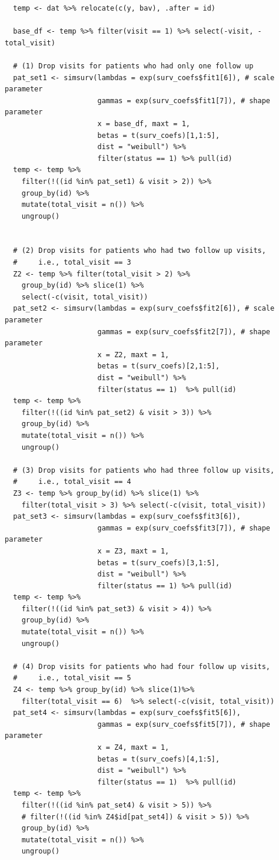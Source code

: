 \documentclass[
]{aft}
\begin{document}
\begin{verbatim}
  temp <- dat %>% relocate(c(y, bav), .after = id) 
  
  base_df <- temp %>% filter(visit == 1) %>% select(-visit, -total_visit)
  
  # (1) Drop visits for patients who had only one follow up 
  pat_set1 <- simsurv(lambdas = exp(surv_coefs$fit1[6]), # scale parameter
                      gammas = exp(surv_coefs$fit1[7]), # shape parameter
                      x = base_df, maxt = 1, 
                      betas = t(surv_coefs)[1,1:5],
                      dist = "weibull") %>% 
                      filter(status == 1) %>% pull(id)
  temp <- temp %>% 
    filter(!((id %in% pat_set1) & visit > 2)) %>% 
    group_by(id) %>% 
    mutate(total_visit = n()) %>% 
    ungroup()
  
  
  # (2) Drop visits for patients who had two follow up visits, 
  #     i.e., total_visit == 3 
  Z2 <- temp %>% filter(total_visit > 2) %>% 
    group_by(id) %>% slice(1) %>% 
    select(-c(visit, total_visit))
  pat_set2 <- simsurv(lambdas = exp(surv_coefs$fit2[6]), # scale parameter
                      gammas = exp(surv_coefs$fit2[7]), # shape parameter
                      x = Z2, maxt = 1, 
                      betas = t(surv_coefs)[2,1:5],
                      dist = "weibull") %>% 
                      filter(status == 1)  %>% pull(id)
  temp <- temp %>% 
    filter(!((id %in% pat_set2) & visit > 3)) %>% 
    group_by(id) %>% 
    mutate(total_visit = n()) %>% 
    ungroup()
  
  # (3) Drop visits for patients who had three follow up visits, 
  #     i.e., total_visit == 4 
  Z3 <- temp %>% group_by(id) %>% slice(1) %>% 
    filter(total_visit > 3) %>% select(-c(visit, total_visit))
  pat_set3 <- simsurv(lambdas = exp(surv_coefs$fit3[6]), 
                      gammas = exp(surv_coefs$fit3[7]), # shape parameter
                      x = Z3, maxt = 1,
                      betas = t(surv_coefs)[3,1:5],
                      dist = "weibull") %>% 
                      filter(status == 1) %>% pull(id)
  temp <- temp %>% 
    filter(!((id %in% pat_set3) & visit > 4)) %>% 
    group_by(id) %>% 
    mutate(total_visit = n()) %>% 
    ungroup()
  
  # (4) Drop visits for patients who had four follow up visits, 
  #     i.e., total_visit == 5 
  Z4 <- temp %>% group_by(id) %>% slice(1)%>% 
    filter(total_visit == 6)  %>% select(-c(visit, total_visit))
  pat_set4 <- simsurv(lambdas = exp(surv_coefs$fit5[6]), 
                      gammas = exp(surv_coefs$fit5[7]), # shape parameter
                      x = Z4, maxt = 1,
                      betas = t(surv_coefs)[4,1:5],
                      dist = "weibull") %>% 
                      filter(status == 1)  %>% pull(id)
  temp <- temp %>% 
    filter(!((id %in% pat_set4) & visit > 5)) %>% 
    # filter(!((id %in% Z4$id[pat_set4]) & visit > 5)) %>% 
    group_by(id) %>% 
    mutate(total_visit = n()) %>% 
    ungroup()
  

\end{verbatim}
\end{document}
